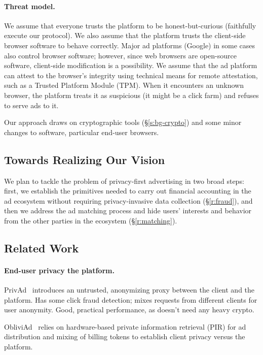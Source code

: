 \paragraph{Threat model.}
%
We assume that everyone trusts the platform to be honest-but-curious (\ie faithfully execute our protocol). 
%
We also assume that the platform trusts the client-side browser software to behave correctly.
%
Major ad platforms (\eg Google) in some cases also control browser software; however, since web browsers are open-source software, client-side modification is a possibility.
%
We assume that the ad platform can attest to the browser's integrity using technical means for remote attestation, such as a Trusted Platform Module (TPM).
%
When it encounters an unknown browser, the platform treats it as suspicious (\ie it might be a click farm) and refuses to serve ads to it.
%

Our approach draws on cryptographic tools (\S\ref{s:bg-crypto}) and some minor
changes to software, particular end-user browsers.

\subsection{Towards Realizing Our Vision}
We plan to tackle the problem of privacy-first advertising in two broad steps:
first, we establish the primitives needed to carry out financial accounting in
the ad ecosystem without requiring privacy-invasive data
collection (\S\ref{r:fraud}), and then we address the ad matching process and
hide users' interests and behavior from the other parties in the ecosystem
(\S\ref{r:matching}).


\subsection{Related Work}
\label{s:bg-related}

\paragraph{End-user privacy \vs the platform.}
%
PrivAd~\cite{privad} introduces an untrusted, anonymizing proxy between the
client and the platform.
%
Has some click fraud detection; mixes requests from different clients for user
anonymity.
%
Good, practical performance, as doesn't need any heavy crypto.
%

%
ObliviAd~\cite{obliviad} relies on hardware-based private information retrieval
(PIR) for ad distribution and mixing of billing tokens to establish client
privacy versus the platform.
%

